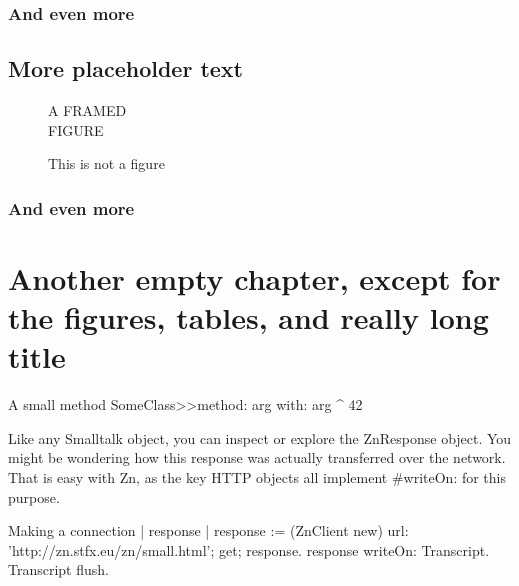 \documentclass[openany]{sbabook}
\begin{document}
\textlatin{\lipsum[3]}


\subsection{And even more}

\textlatin{\lipsum[4]}


\section{More placeholder text}

\textlatin{\lipsum[3]}

\begin{figure}
    A FRAMED\\
    FIGURE
    \caption{This is not a figure}
\end{figure}


\subsection{And even more}

\textlatin{\lipsum[4]}



\chapter{Another empty chapter, except for the figures, tables, and really long title}

\begin{leftbar}
    \lipsum[2]
\end{leftbar}

\begin{script}[fortytwo]{A small method}
SomeClass>>method: arg with: arg
    ^ 42
\end{script}

Like any Smalltalk object, you can inspect or explore the ZnResponse object. You might be wondering how this response was actually transferred over the network. That is easy with Zn, as the key HTTP objects all implement \#writeOn: for this purpose.

\begin{script}{Making a connection}
| response |
response := (ZnClient new)
  url: 'http://zn.stfx.eu/zn/small.html';
  get;
  response.
response writeOn: Transcript.
Transcript flush.
\end{script}
\end{document}
